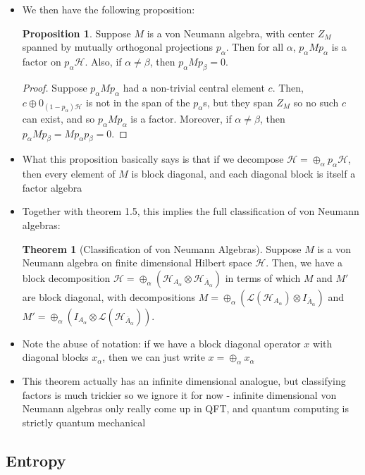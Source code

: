 \documentclass[12pt,a4paper]{article}
\numberwithin{equation}{section}
\theoremstyle{definition}
\theoremstyle{theorem}
\newtheorem{theorem}{Theorem}[section]
\newtheorem{proposition}{Proposition}
\begin{document}
\begin{itemize}
		\item We then have the following proposition:
		\begin{proposition}
			Suppose $M$ is a von Neumann algebra, with center $Z_{M}$ spanned by mutually orthogonal projections $p_{\alpha}$. Then for all $\alpha$, $p_{\alpha}Mp_{\alpha}$ is a factor on $p_{\alpha}\mathcal{H}$. Also, if $\alpha\neq \beta$, then $p_{\alpha}Mp_{\beta}=0$.
		\end{proposition}
		\begin{proof}
			Suppose $p_{\alpha}Mp_{\alpha}$ had a non-trivial central element $c$. Then, $c\oplus 0_{(1-p_{\alpha})\mathcal{H}}$ is not in the span of the $p_{\alpha}$s, but they span $Z_{M}$ so no such $c$ can exist, and so $p_{\alpha}Mp_{\alpha}$ is a factor. Moreover, if $\alpha\neq\beta$, then $p_{\alpha}Mp_{\beta}=Mp_{\alpha}p_{\beta}=0$.
		\end{proof}
		\item What this proposition basically says is that if we decompose $\mathcal{H}=\oplus_{\alpha}p_{\alpha}\mathcal{H}$, then every element of $M$ is block diagonal, and each diagonal block is itself a factor algebra
		\item Together with theorem 1.5, this implies the full classification of von Neumann algebras:
		\begin{theorem}[Classification of von Neumann Algebras]
			Suppose $M$ is a von Neumann algebra on finite dimensional Hilbert space $\mathcal{H}$. Then, we have a block decomposition $\mathcal{H}=\oplus_{\alpha}\left(\mathcal{H}_{A_{\alpha}}\otimes\mathcal{H}_{\overline{A}_{\alpha}}\right)$ in terms of which $M$ and $M'$ are block diagonal, with decompositions $M=\oplus_{\alpha}\left(\mathcal{L}(\mathcal{H}_{A_{\alpha}})\otimes I_{\overline{A}_{\alpha}}\right)$ and $M'=\oplus_{\alpha}\left(I_{A_{\alpha}}\otimes\mathcal{L}(\mathcal{H}_{\overline{A}_{\alpha}})\right)$.
		\end{theorem}
		\item Note the abuse of notation: if we have a block diagonal operator $x$ with diagonal blocks $x_{\alpha}$, then we can just write $x=\oplus_{\alpha}x_{\alpha}$
		\item This theorem actually has an infinite dimensional analogue, but classifying factors is much trickier so we ignore it for now - infinite dimensional von Neumann algebras only really come up in QFT, and quantum computing is strictly quantum mechanical
	\end{itemize}
	\subsection{Entropy}
\end{document}
